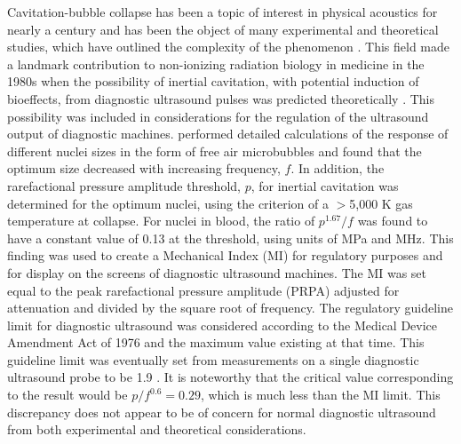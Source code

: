 Cavitation-bubble collapse has been a topic of interest in physical
acoustics for nearly a century and has been the object of many
experimental and theoretical studies, which have outlined the
complexity of the phenomenon \cite[]{Leighton1997}.  This field made a
landmark contribution to non-ionizing radiation biology in medicine in
the 1980s when the possibility of inertial cavitation, with potential
induction of bioeffects, from diagnostic ultrasound pulses was
predicted theoretically \cite[]{Flynn1982,Apfel1982}.  This
possibility was included in considerations for the regulation of the
ultrasound output of diagnostic machines.  \cite{Apfel1991} performed
detailed calculations of the response of different nuclei sizes in
the form of free air microbubbles and found that the optimum size
decreased with increasing frequency, $f$.  In addition, the
rarefactional pressure amplitude threshold, $p$, for inertial
cavitation was determined for the optimum nuclei, using the criterion
of a $>$5,000 K gas temperature at collapse.  For nuclei in blood, the
ratio of $p^{1.67}/f$ was found to have a constant value of 0.13 at
the threshold, using units of MPa and MHz.  This finding was used to
create a Mechanical Index (MI) for regulatory purposes and for display
on the screens of diagnostic ultrasound machines.  The MI was set
equal to the peak rarefactional pressure amplitude (PRPA) adjusted for
attenuation and divided by the square root of frequency.  The
regulatory guideline limit for diagnostic ultrasound was considered
according to the Medical Device Amendment Act of 1976 and the maximum
value existing at that time.  This guideline limit was eventually set
from measurements on a single diagnostic ultrasound probe to be 1.9
\cite[]{Nyborg2001}.  It is noteworthy that the critical value
corresponding to the \cite{Apfel1991} result would be
\textbf{$p/f^{0.6}=0.29$}, which is much less than the MI limit.  This
discrepancy does not appear to be of concern for normal diagnostic
ultrasound from both experimental \cite[]{Carstensen2000} and
theoretical \cite[]{Church2002} considerations.

